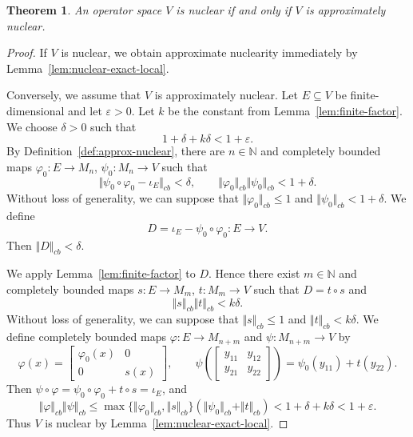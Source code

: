 \documentclass[12pt]{article}
\newtheorem{theorem}{Theorem}[section]
\theoremstyle{definition}
\theoremstyle{remark}
\begin{document}
\begin{theorem}\label{lem:nuclear-local-approx}
An operator space $V$ is nuclear if and only if $V$ is approximately
nuclear.
\end{theorem}

\begin{proof}
If $V$ is nuclear, we obtain approximate nuclearity immediately by Lemma~\ref{lem:nuclear-exact-local}.

Conversely, we assume that $V$ is approximately nuclear.
Let $E\subseteq V$ be finite-dimensional and let $\varepsilon>0$. Let
$k$ be the constant from Lemma~\ref{lem:finite-factor}. We choose
$\delta>0$ such that
\[
1+\delta+k\delta<1+\varepsilon.
\]
By Definition~\ref{def:approx-nuclear}, there are $n\in\mathbb N$ and
completely bounded maps $\varphi_0:E\to M_n$, $\psi_0:M_n\to V$ such that
\[
\Vert\psi_0\circ\varphi_0-\iota_E\Vert_{cb}<\delta,\qquad
\Vert\varphi_0\Vert_{cb}\Vert\psi_0\Vert_{cb}<1+\delta.
\]
Without loss of generality, we can suppose that $\Vert \varphi_{0}\Vert_{cb}\leq 1$ and $\Vert \psi_{0}\Vert_{cb}<1+\delta$. We define
\[
D=\iota_E-\psi_0\circ\varphi_0:E\to V.
\]
Then $\Vert D\Vert_{cb}<\delta$.

We apply Lemma~\ref{lem:finite-factor} to $D$. Hence there exist $m\in\mathbb N$ and completely bounded maps
$s:E\to M_m$, $t:M_m\to V$ such that $D=t\circ s$ and
\[
\Vert s\Vert_{cb}\Vert t\Vert_{cb}<k\delta.
\]
Without loss of generality, we can suppose that $\Vert s\Vert_{cb}\leq 1$ and $\Vert t\Vert_{cb}<k\delta$. We define completely bounded maps $\varphi:E\to M_{n+m}$ and $\psi:M_{n+m}\to V$ by
\[
\varphi(x) = \begin{bmatrix} \varphi_0(x) & 0 \\ 0 & s(x) \end{bmatrix},
\qquad
\psi\left( \begin{bmatrix} y_{11} & y_{12} \\ y_{21} & y_{22} \end{bmatrix} \right)
= \psi_0(y_{11}) + t(y_{22}).
\]
Then $\psi\circ\varphi = \psi_0\circ\varphi_0 + t\circ s = \iota_E$, and
\[
\Vert\varphi\Vert_{cb}\Vert\psi\Vert_{cb}
\leq\max\{\Vert\varphi_0\Vert_{cb}, \Vert s\Vert_{cb}\} (\Vert\psi_0\Vert_{cb} + \Vert t\Vert_{cb})
<1+\delta+k\delta<1+\varepsilon.
\]
Thus $V$ is nuclear by Lemma~\ref{lem:nuclear-exact-local}.
\end{proof}
\end{document}
